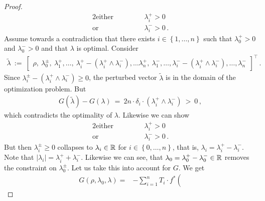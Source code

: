 \begin{proof}
\begin{alignat*}{2}
  \text{either}
  &
  &&
  \qquad
      \lambda_i^+ > 0
  \\
  \text{or}
  &
  &&
  \qquad
      \lambda_i^- > 0
  \,.
\end{alignat*}
Assume towards a contradiction that 
there exists
$i \in \left\{ 1,\ldots,n \right\}$
such that
$
      \lambda_0^+ > 0
$
and
$
      \lambda_0^- > 0
$ 
and that 
$\lambda$ is optimal.
Consider
  \begin{gather}
    \tilde{\lambda}
    \ 
    :=
    \ 
    \begin{bmatrix}
      \rho
      ,
      \ 
      \lambda_0^\pm,
      \ 
      \lambda_1^+,
      \ldots,
      \ 
      \lambda_i^+
      \!
      -
      (
      \lambda_i^+
      \!
      \land
      \lambda_i^-
      ),
      \ldots
      \lambda_n^+,
      \ 
      \lambda_1^-,
      \ldots,
      \lambda_i^-
      \!
      -
      (
      \lambda_i^+
      \!
      \land
      \lambda_i^-
      ),
      \ldots,
      \lambda_n^-
    \end{bmatrix}
    ^\top
    \,.
  \end{gather}
  Since 
  $
      \lambda_i^\pm
      -
      (
      \lambda_i^+
      \!
      \land
      \lambda_i^-
      )
      \ge 
      0
  $,
  the perturbed vector $\tilde{\lambda}$ is in the domain of the 
  optimization problem.
  But 
  \begin{align}
  G(\tilde{\lambda})
  -
  G(\lambda)
  \ 
  =
  \ 
  2
  n
  \cdot
  \delta_i
  \cdot
      (
      \lambda_i^+
      \!
      \land
      \lambda_i^-
      )
  \ 
  >
  \ 
  0
  \,,
  \end{align}
  which contradicts the optimality of $\lambda$.
  Likewise we can show
\begin{alignat*}{2}
  \text{either}
  &
  &&
  \qquad
      \lambda_i^+ > 0
  \\
  \text{or}
  &
  &&
  \qquad
      \lambda_i^- > 0
  \,.
\end{alignat*}
But then 
$
\lambda^\pm_i
\ge 0
$
collapses to
$
\lambda_i\in \mathbb{R}
$ 
for 
$i\in \left\{ 0,\ldots,n \right\}$, that is,
$ \lambda_i=\lambda_i^+\!-\lambda_i^- $.
Note that
$ |\lambda_i|=\lambda_i^+\!+\lambda_i^- $.
Likewise we can see, that 
$
\lambda_0
=
\lambda_0^+
-
\lambda_0^-
\in \mathbb{R}
$
removes the constraint on $\lambda_0^\pm$.
Let us take this into account for $G$. We get
  \begin{align*}
    G
    (
    \rho,
    \lambda_0,
    \lambda
    )
    =
  &-
  \sum_{i=1} 
  ^n
  T_i
  \cdot
  f^*
  \left( 

\end{align*}
\end{proof}
